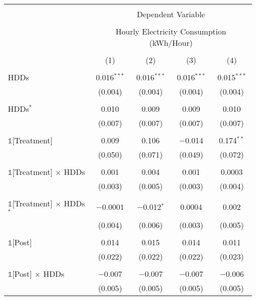 
\begin{table}[!htbp] \centering 
  \label{Table:Breakdown-of-Average-Treatement-Effects_By-Tariff_15-to-16} 
\scriptsize 
\begin{tabular}{@{\extracolsep{30pt}}lcccc} 
\\[-1.8ex]\hline 
\hline \\[-1.8ex] 
 & \multicolumn{4}{c}{Dependent Variable} \\ 
\cline{2-5} 
\\[-1.8ex] & \multicolumn{4}{c}{Hourly Electricity Consumption  (kWh/Hour)} \\ 
\\[-1.8ex] & (1) & (2) & (3) & (4)\\ 
\hline \\[-1.8ex] 
 HDDs & 0.016$^{***}$ & 0.016$^{***}$ & 0.016$^{***}$ & 0.015$^{***}$ \\ 
  & (0.004) & (0.004) & (0.004) & (0.004) \\ 
  & & & & \\ 
 HDDs$^{*}$ & 0.010 & 0.009 & 0.009 & 0.010 \\ 
  & (0.007) & (0.007) & (0.007) & (0.007) \\ 
  & & & & \\ 
 $\mathbb{1}$[Treatment] & 0.009 & 0.106 & $-$0.014 & 0.174$^{**}$ \\ 
  & (0.050) & (0.071) & (0.049) & (0.072) \\ 
  & & & & \\ 
 $\mathbb{1}$[Treatment] $\times$ HDDs & 0.001 & 0.004 & 0.001 & 0.0003 \\ 
  & (0.003) & (0.005) & (0.003) & (0.004) \\ 
  & & & & \\ 
 $\mathbb{1}$[Treatment] $\times$ HDDs$^{*}$ & $-$0.0001 & $-$0.012$^{*}$ & 0.0004 & 0.002 \\ 
  & (0.004) & (0.006) & (0.003) & (0.005) \\ 
  & & & & \\ 
 $\mathbb{1}$[Post] & 0.014 & 0.015 & 0.014 & 0.011 \\ 
  & (0.022) & (0.022) & (0.022) & (0.023) \\ 
  & & & & \\ 
 $\mathbb{1}$[Post] $\times$ HDDs & $-$0.007 & $-$0.007 & $-$0.007 & $-$0.006 \\ 
  & (0.005) & (0.005) & (0.005) & (0.005) \\ 

\end{tabular}
\end{table}
